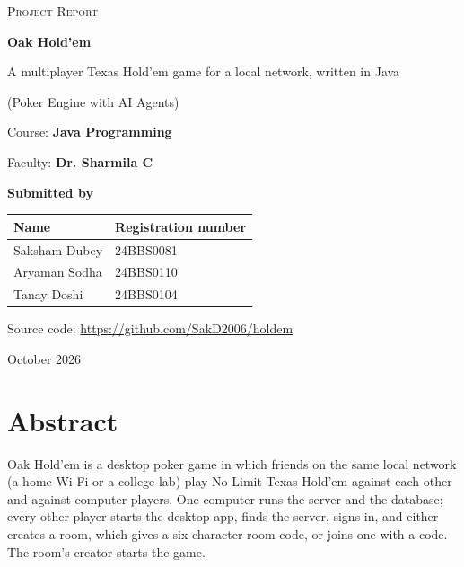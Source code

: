 \documentclass[12pt,a4paper]{article}
\newcommand{\repo}{\url{https://github.com/SakD2006/holdem}}
\begin{document}
\begin{titlepage}
\centering
\vspace*{1.5cm}
{\large\textsc{Project Report}\par}
\vspace{1.2cm}
{\Huge\bfseries Oak Hold'em\par}
\vspace{0.4cm}
{\Large A multiplayer Texas Hold'em game for a local network, written in Java\par}
\vspace{0.3cm}
{\large (Poker Engine with AI Agents)\par}
\vspace{1.6cm}
{\large Course: \textbf{Java Programming}\par}
\vspace{0.3cm}
{\large Faculty: \textbf{Dr. Sharmila C}\par}
\vspace{1.6cm}
{\large\textbf{Submitted by}\par}
\vspace{0.4cm}
\begin{tabular}{ll}
\toprule
Name & Registration number \\
\midrule
Saksham Dubey & 24BBS0081 \\
Aryaman Sodha & 24BBS0110 \\
Tanay Doshi & 24BBS0104 \\
\bottomrule
\end{tabular}
\vfill
{\large Source code: \repo\par}
\vspace{0.6cm}
{\large October 2026\par}
\end{titlepage}

\section*{Abstract}

Oak Hold'em is a desktop poker game in which friends on the same local network (a home Wi-Fi or
a college lab) play No-Limit Texas Hold'em against each other and against computer players.
One computer runs the server and the database; every other player starts the desktop app, finds
the server, signs in, and either creates a room, which gives a six-character room code, or joins
one with a code. The room's creator starts the game.
\end{document}
